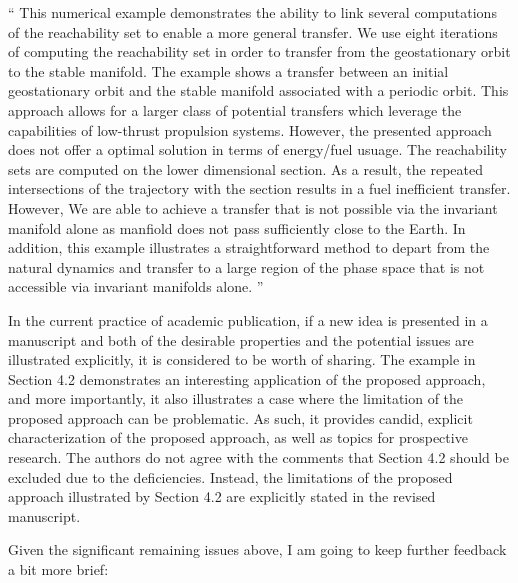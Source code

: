 \documentclass[11pt]{article}
\newenvironment{correction}{\begin{list}{}{\setlength{\leftmargin}{1cm}\setlength{\rightmargin}{1cm}}\vspace{\parsep}\item[]``}{''\end{list}}
\begin{document}
\begin{itemize}
        \begin{correction}
            This numerical example demonstrates the ability to link several computations of the reachability set to enable a more general transfer.
            We use eight iterations of computing the reachability set in order to transfer from the geostationary orbit to the stable manifold.
            The example shows a transfer between an initial geostationary orbit and the stable manifold associated with a periodic orbit. 
            This approach allows for a larger class of potential transfers which leverage the capabilities of low-thrust propulsion systems.
            However, the presented approach does not offer a optimal solution in terms of energy/fuel usuage. 
            The reachability sets are computed on the lower dimensional \Poincare section.
            As a result, the repeated intersections of the trajectory with the \Poincare section results in a fuel inefficient transfer.
            However, We are able to achieve a transfer that is not possible via the invariant manifold alone as manfiold does not pass sufficiently close to the Earth.
            In addition, this example illustrates a straightforward method to depart from the natural dynamics and transfer to a large region of the phase space that is not accessible via invariant manifolds alone.
        \end{correction}

        In the current practice of academic publication, if a new idea is presented in a manuscript and both of the desirable properties and the potential issues are illustrated explicitly, it is considered to be worth of sharing. 
        The example in Section 4.2 demonstrates an interesting application of the proposed approach, and more importantly, it also illustrates a case where the limitation of the proposed approach can be problematic.
        As such, it provides candid, explicit characterization of the proposed approach, as well as topics for prospective research. 
        The authors do not agree with the comments that Section 4.2 should be excluded due to the deficiencies. 
        Instead, the limitations of the proposed approach illustrated by Section 4.2 are explicitly stated in the revised manuscript.

    \item
        \begin{itshape}

            Given the significant remaining issues above, I am going to keep further
            feedback a bit more brief:


\end{itshape}
\end{itemize}
\end{document}

